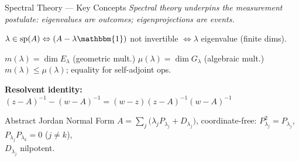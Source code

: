 \documentclass{beamer}
\newcommand{\Spec}{\mathrm{sp}}
\begin{document}
\begin{frame}[shrink=10]{Spectral Theory --- Key Concepts}
  \small
  \textit{Spectral theory underpins the measurement postulate: eigenvalues are outcomes; eigenprojections are events.}

  \vspace{0.2em}
  $\lambda\in\Spec(A) \Leftrightarrow (A-\lambda\mathbbm{1})$ not invertible $\Leftrightarrow \lambda$ eigenvalue (finite dims).

  \vspace{0.2em}
  \begin{tcolorbox}[mathbox, left=3pt, right=3pt, top=2pt, bottom=2pt]
    $m(\lambda)=\dim E_\lambda$ (geometric mult.) \quad
    $\mu(\lambda)=\dim G_\lambda$ (algebraic mult.) \quad
    $m(\lambda)\le\mu(\lambda)$; equality for self-adjoint ops.
  \end{tcolorbox}

  \vspace{0.2em}
  \begin{tcolorbox}[mathbox, left=3pt, right=3pt, top=2pt, bottom=2pt]
    \textbf{Resolvent identity:}\quad
    $(z-A)^{-1}-(w-A)^{-1} = (w-z)(z-A)^{-1}(w-A)^{-1}$
  \end{tcolorbox}

  \vspace{0.2em}
  \begin{block}{Abstract Jordan Normal Form}
  \justifying
    $A = \sum_j \bigl(\lambda_j P_{\lambda_j} + D_{\lambda_j}\bigr)$,\;
    coordinate-free: $P_{\lambda_j}^2=P_{\lambda_j}$,\; $P_{\lambda_j}P_{\lambda_k}=0$ ($j\ne k$),\;\\
    $D_{\lambda_j}$ nilpotent.
  \end{block}
\end{frame}
\end{document}

